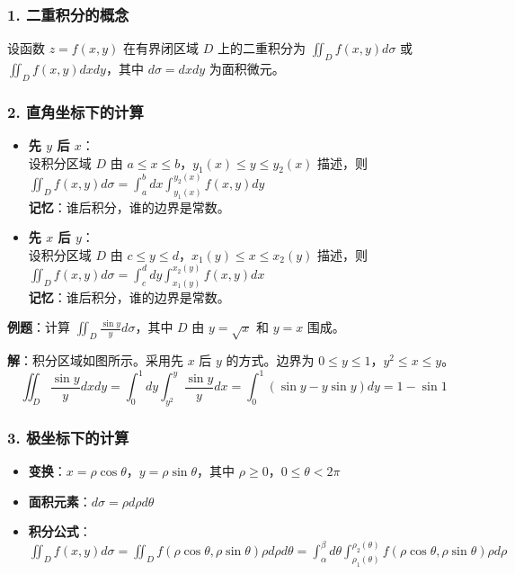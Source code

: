 \documentclass[12pt,a4paper]{ctexart}
\begin{document}
\subsubsection{1. 二重积分的概念}
设函数 $z = f(x,y)$ 在有界闭区域 $D$ 上的二重积分为 $\iint_D f(x,y) d\sigma$ 或 $\iint_D f(x,y) dx dy$，其中 $d\sigma = dx dy$ 为面积微元。

\subsubsection{2. 直角坐标下的计算}
\begin{itemize}[noitemsep]
    \item \textbf{先 $y$ 后 $x$}：\\
          设积分区域 $D$ 由 $a \le x \le b$，$y_1(x) \le y \le y_2(x)$ 描述，则\\
          $\iint_D f(x,y) d\sigma = \int_a^b dx \int_{y_1(x)}^{y_2(x)} f(x,y) dy$\\
          \textbf{记忆}：谁后积分，谁的边界是常数。

    \item \textbf{先 $x$ 后 $y$}：\\
          设积分区域 $D$ 由 $c \le y \le d$，$x_1(y) \le x \le x_2(y)$ 描述，则\\
          $\iint_D f(x,y) d\sigma = \int_c^d dy \int_{x_1(y)}^{x_2(y)} f(x,y) dx$\\
          \textbf{记忆}：谁后积分，谁的边界是常数。
\end{itemize}

\textbf{例题}：计算 $\iint_D \frac{\sin y}{y} d\sigma$，其中 $D$ 由 $y = \sqrt{x}$ 和 $y = x$ 围成。

\textbf{解}：积分区域如图所示。采用先 $x$ 后 $y$ 的方式。边界为 $0 \le y \le 1$，$y^2 \le x \le y$。
\[ \iint_D \frac{\sin y}{y} dx dy = \int_0^1 dy \int_{y^2}^{y} \frac{\sin y}{y} dx = \int_0^1 (\sin y - y \sin y) dy = 1 - \sin 1 \]

\subsubsection{3. 极坐标下的计算}
\begin{itemize}[noitemsep]
    \item \textbf{变换}：$x = \rho \cos \theta$，$y = \rho \sin \theta$，其中 $\rho \ge 0$，$0 \le \theta < 2\pi$
    \item \textbf{面积元素}：$d\sigma = \rho d\rho d\theta$
    \item \textbf{积分公式}：\\
          $\iint_D f(x,y) d\sigma = \iint_D f(\rho \cos \theta, \rho \sin \theta) \rho d\rho d\theta = \int_\alpha^\beta d\theta \int_{\rho_1(\theta)}^{\rho_2(\theta)} f(\rho \cos \theta, \rho \sin \theta) \rho d\rho$
\end{itemize}
\end{document}
